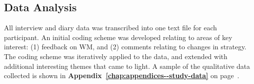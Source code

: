 
\subsection{Data Analysis}
\label{main-study:method:data-analysis}



All interview and diary data was transcribed into one text file for each participant.  An initial coding scheme was developed relating to areas of key interest: (1) feedback on WM, and (2) comments relating to changes in strategy.  The coding scheme was iteratively applied to the data, and extended with additional interesting themes that came to light.  A sample of the qualitative data collected is shown in \textbf{Appendix~\ref{chap:appendices--study-data}} on page~\pageref{chap:appendices--study-data:main-study}.

